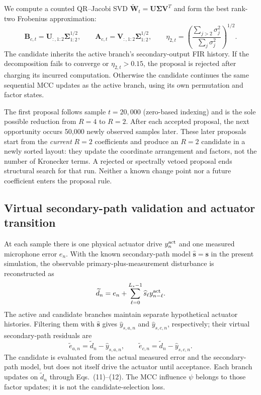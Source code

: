 We compute a counted QR--Jacobi SVD
$\widetilde{\mathbf W}_t=\mathbf U\boldsymbol\Sigma\mathbf V^T$ and form
the best rank-two Frobenius approximation:
\begin{equation}
 \mathbf{B}_{c,t}=\mathbf U_{:,1:2}
          \boldsymbol\Sigma_{1:2}^{1/2},\qquad
 \mathbf{A}_{c,t}=\mathbf V_{:,1:2}
          \boldsymbol\Sigma_{1:2}^{1/2},\qquad
 \eta_{2,t}=
 \left(\frac{\sum_{j>2}\sigma_j^2}{\sum_j\sigma_j^2}\right)^{1/2}.
 \label{eq:n14_truncation}
\end{equation}
The candidate inherits the active branch's secondary-output FIR history.
If the decomposition fails to converge or $\eta_{2,t}>0.15$, the proposal
is rejected after charging its incurred computation.  Otherwise the
candidate continues the same sequential MCC updates as the active branch,
using its own permutation and factor states.

The first proposal follows sample $t=20{,}000$ (zero-based indexing) and
is the sole possible reduction from $R=4$ to $R=2$.  After each accepted
proposal, the next opportunity occurs 50{,}000 newly observed samples
later.  These later proposals start from the \emph{current} $R=2$
coefficients and produce an $R=2$ candidate in a newly sorted layout:
they update the coordinate arrangement and factors, not the number of
Kronecker terms.  A rejected or spectrally vetoed proposal ends structural
search for that run.  Neither a known change point nor a future coefficient
enters the proposal rule.

\subsection{Virtual secondary-path validation and actuator transition}
At each sample there is one physical actuator drive $y_n^{\rm act}$ and
one measured microphone error $e_n$.  With the known secondary-path model
$\widehat{\mathbf s}=\mathbf s$ in the present simulation, the observable
primary-plus-measurement disturbance is reconstructed as
\begin{equation}
 \widetilde d_n=e_n+
       \sum_{\ell=0}^{L_s-1}\widehat s_\ell
                              y_{n-\ell}^{\rm act}.
 \label{eq:n14_d_reconstruction}
\end{equation}
The active and candidate branches maintain separate hypothetical actuator
histories.  Filtering them with $\widehat{\mathbf s}$ gives
$\widehat y_{s,a,n}$ and $\widehat y_{s,c,n}$, respectively; their virtual
secondary-path residuals are
\begin{equation}
 \widetilde e_{a,n}=\widetilde d_n-\widehat y_{s,a,n},
 \qquad
 \widetilde e_{c,n}=\widetilde d_n-\widehat y_{s,c,n}.
 \label{eq:n14_virtual_residuals}
\end{equation}
The candidate is evaluated from the actual measured error and the
secondary-path model, but does not itself drive the actuator until
acceptance.  Each branch updates on $\widetilde d_n$ through
Eqs.~(11)--(12).  The MCC influence $\psi$ belongs to those factor
updates; it is not the candidate-selection loss.

